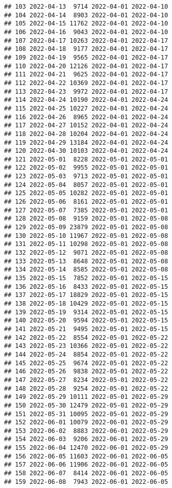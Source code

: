 \documentclass[
]{article}
\begin{document}
\begin{verbatim}
## 103 2022-04-13  9714 2022-04-01 2022-04-10
## 104 2022-04-14  8903 2022-04-01 2022-04-10
## 105 2022-04-15 11762 2022-04-01 2022-04-10
## 106 2022-04-16  9043 2022-04-01 2022-04-10
## 107 2022-04-17 10263 2022-04-01 2022-04-17
## 108 2022-04-18  9177 2022-04-01 2022-04-17
## 109 2022-04-19  9565 2022-04-01 2022-04-17
## 110 2022-04-20 12126 2022-04-01 2022-04-17
## 111 2022-04-21  9625 2022-04-01 2022-04-17
## 112 2022-04-22 10369 2022-04-01 2022-04-17
## 113 2022-04-23  9972 2022-04-01 2022-04-17
## 114 2022-04-24 10190 2022-04-01 2022-04-24
## 115 2022-04-25 10227 2022-04-01 2022-04-24
## 116 2022-04-26  8965 2022-04-01 2022-04-24
## 117 2022-04-27 10152 2022-04-01 2022-04-24
## 118 2022-04-28 10204 2022-04-01 2022-04-24
## 119 2022-04-29 13184 2022-04-01 2022-04-24
## 120 2022-04-30 10103 2022-04-01 2022-04-24
## 121 2022-05-01  8228 2022-05-01 2022-05-01
## 122 2022-05-02  9955 2022-05-01 2022-05-01
## 123 2022-05-03  9713 2022-05-01 2022-05-01
## 124 2022-05-04  8057 2022-05-01 2022-05-01
## 125 2022-05-05 10282 2022-05-01 2022-05-01
## 126 2022-05-06  8161 2022-05-01 2022-05-01
## 127 2022-05-07  7385 2022-05-01 2022-05-01
## 128 2022-05-08  9159 2022-05-01 2022-05-08
## 129 2022-05-09 23879 2022-05-01 2022-05-08
## 130 2022-05-10 11967 2022-05-01 2022-05-08
## 131 2022-05-11 10298 2022-05-01 2022-05-08
## 132 2022-05-12  9071 2022-05-01 2022-05-08
## 133 2022-05-13  8648 2022-05-01 2022-05-08
## 134 2022-05-14  8585 2022-05-01 2022-05-08
## 135 2022-05-15  7852 2022-05-01 2022-05-15
## 136 2022-05-16  8433 2022-05-01 2022-05-15
## 137 2022-05-17 18829 2022-05-01 2022-05-15
## 138 2022-05-18 10429 2022-05-01 2022-05-15
## 139 2022-05-19  9314 2022-05-01 2022-05-15
## 140 2022-05-20  9594 2022-05-01 2022-05-15
## 141 2022-05-21  9495 2022-05-01 2022-05-15
## 142 2022-05-22  8554 2022-05-01 2022-05-22
## 143 2022-05-23 10366 2022-05-01 2022-05-22
## 144 2022-05-24  8854 2022-05-01 2022-05-22
## 145 2022-05-25  9674 2022-05-01 2022-05-22
## 146 2022-05-26  9838 2022-05-01 2022-05-22
## 147 2022-05-27  8234 2022-05-01 2022-05-22
## 148 2022-05-28  9254 2022-05-01 2022-05-22
## 149 2022-05-29 10111 2022-05-01 2022-05-29
## 150 2022-05-30 12479 2022-05-01 2022-05-29
## 151 2022-05-31 10095 2022-05-01 2022-05-29
## 152 2022-06-01 10079 2022-06-01 2022-05-29
## 153 2022-06-02  8883 2022-06-01 2022-05-29
## 154 2022-06-03  9206 2022-06-01 2022-05-29
## 155 2022-06-04 12470 2022-06-01 2022-05-29
## 156 2022-06-05 11603 2022-06-01 2022-06-05
## 157 2022-06-06 11906 2022-06-01 2022-06-05
## 158 2022-06-07  8414 2022-06-01 2022-06-05
## 159 2022-06-08  7943 2022-06-01 2022-06-05

\end{verbatim}
\end{document}
